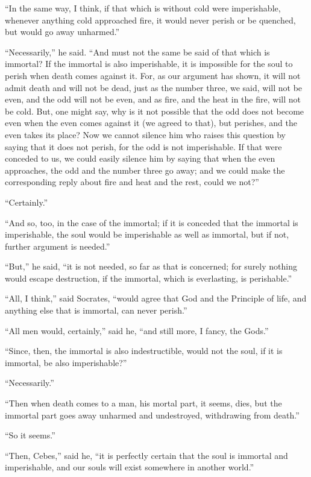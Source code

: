 \documentclass[letterpaper,12pt]{article}
\newcommand{\stephpag}[1]{\marginnote{\small\itshape\fontfamily{ppl}\selectfont #1}}
\begin{document}
\begin{drama}
``In the same way, I think, if that which is without cold were imperishable, whenever anything cold approached fire, it would never perish or be quenched, but would go away unharmed.''
 
``Necessarily,'' he said. \stephpag{b} ``And must not the same be said of that which is immortal? If the immortal is also imperishable, it is impossible for the soul to perish when death comes against it. For, as our argument has shown, it will not admit death and will not be dead, just as the number three, we said, will not be even, and the odd will not be even, and as fire, and the heat in the fire, will not be cold. But, one might say, why is it not possible that the odd does not become even when the even comes against it (we agreed to that), but perishes, \stephpag{c} and the even takes its place? Now we cannot silence him who raises this question by saying that it does not perish, for the odd is not imperishable. If that were conceded to us, we could easily silence him by saying that when the even approaches, the odd and the number three go away; and we could make the corresponding reply about fire and heat and the rest, could we not?''
 
``Certainly.''
 
``And so, too, in the case of the immortal; if it is conceded that the immortal is imperishable, the soul would be imperishable as well as immortal, \stephpag{d} but if not, further argument is needed.''
 
``But,'' he said, ``it is not needed, so far as that is concerned; for surely nothing would escape destruction, if the immortal, which is everlasting, is perishable.''
 
``All, I think,'' said Socrates, ``would agree that God and the Principle of life, and anything else that is immortal, can never perish.''
 
``All men would, certainly,'' said he, ``and still more, I fancy, the Gods.''
 
``Since, then, the immortal \stephpag{e} is also indestructible, would not the soul, if it is immortal, be also imperishable?''
 
``Necessarily.''
 
``Then when death comes to a man, his mortal part, it seems, dies, but the immortal part goes away unharmed and undestroyed, withdrawing from death.''
 
``So it seems.''
 
``Then, Cebes,'' said he, ``it is perfectly certain \stephpag{107 a} that the soul is immortal and imperishable, and our souls will exist somewhere in another world.''
 

\end{drama}
\end{document}
